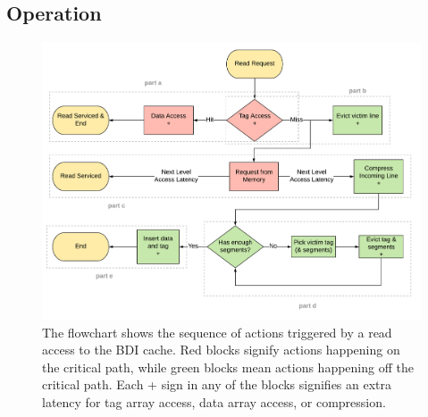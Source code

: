 \subsection{Operation}
\label{ssec:BDIOperations}
\begin{figure}[h]
    \includegraphics[width=\textwidth]{BDI_Read.pdf}
    \caption[BDI Read]{The flowchart shows the sequence of actions triggered by a read access to the BDI cache. Red blocks signify actions happening on the critical path, while green blocks mean actions happening off the critical path. Each + sign in any of the blocks signifies an extra latency for tag array access, data array access, or compression.}
    \label{fig:BDI_Read}
\end{figure}
